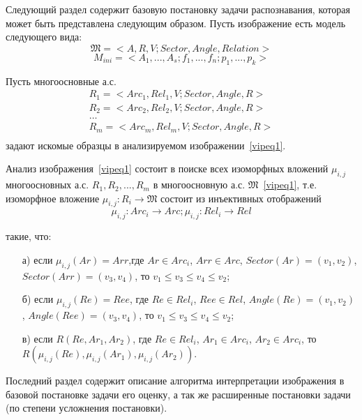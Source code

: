 Следующий раздел содержит базовую постановку задачи распознавания, которая может быть представлена следующим образом. Пусть изображение есть модель следующего вида:
\begin{equation}
\mathfrak{M} = < A, R, V; Sector, Angle, Relation >
\label{vipeq1}
\end{equation}
\begin{equation}
M_{ini} = <A_1,...,A_s;f_1,...,f_n;p_1,...,p_k>
\label{vipeq2}
\end{equation}

Пусть многоосновные а.с.
\begin{equation}
	\begin{array}{c}
	R_1=<Arc_1, Rel_1, V; Sector, Angle, R> \\
	R_2=<Arc_2, Rel_2, V; Sector, Angle, R> \\
	\dots\\
	R_m=<Arc_m, Rel_m, V; Sector, Angle, R> \\
	\end{array}
	\label{vipeq3}
\end{equation}
задают искомые образцы в анализируемом изображении~\ref{vipeq1}.

Анализ изображения~\ref{vipeq1} состоит в поиске всех изоморфных вложений ${ \mu_{i,j} }$ многоосновных а.с. $R_1,R_2,...,R_m$ в многоосновную а.с. $\mathfrak{M}$~\ref{vipeq1}, т.е. изоморфное вложение $\mu_{i,j} : R_i \rightarrow \mathfrak{M}$ состоит из инъективных отображений
\begin{equation}
\mu_{i,j} : Arc_i \rightarrow Arc; \mu_{i,j} : Rel_i \rightarrow Rel
\label{vipeq4}
\end{equation}

\noindent
такие, что:

\begin{enumerate}
\item[а)] если $\mu_{i,j}(Ar) = Arr$,где $Ar \in Arc_i$, $Arr \in Arc$, $Sector(Ar) = (v_1, v_2)$, $Sector(Arr) = (v_3, v_4)$, то $v_1 \le v_3 \le v_4 \le v_2$;
\item[б)] если $\mu_{i,j}(Re) = Ree$, где $Re \in Rel_i$, $Ree \in Rel$, $Angle(Re) = (v_1, v_2)$, $Angle(Ree) = (v_3, v_4)$, то $v_1 \le v_3 \le v_4 \le v_2$;
\item[в)] если $R(Re, Ar_1, Ar_2)$, где $Re \in Rel_i$, $Ar_1 \in Arc_i$, $Ar_2 \in Arc_i$, то $R(\mu_{i,j}(Re), \mu_{i,j}(Ar_1), \mu_{i,j}(Ar_2))$.
\end{enumerate}

Последний раздел содержит описание алгоритма интерпретации изображения в базовой постановке задачи его оценку, а так же расширенные постановки задачи (по степени усложнения постановки). 

